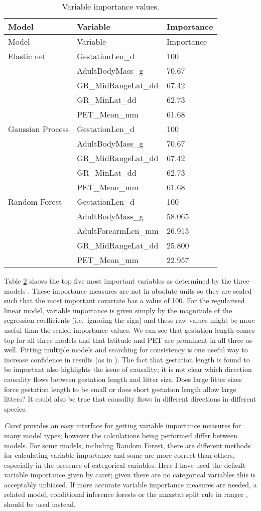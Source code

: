 \documentclass[10pt,]{article}
\begin{document}
\begin{table}[t!]
\begin{longtable}[c]{@{}lll@{}}
\caption{Variable importance values. \label{tbl:varimp}}\tabularnewline
\toprule
Model & Variable & Importance\tabularnewline
\midrule
\endfirsthead
\toprule
Model & Variable & Importance\tabularnewline
\midrule
\endhead
Elastic net & GestationLen\_d & 100\tabularnewline
& AdultBodyMass\_g & 70.67\tabularnewline
& GR\_MidRangeLat\_dd & 67.42\tabularnewline
& GR\_MinLat\_dd & 62.73\tabularnewline
& PET\_Mean\_mm & 61.68\tabularnewline
Gaussian Process & GestationLen\_d & 100\tabularnewline
& AdultBodyMass\_g & 70.67\tabularnewline
& GR\_MidRangeLat\_dd & 67.42\tabularnewline
& GR\_MinLat\_dd & 62.73\tabularnewline
& PET\_Mean\_mm & 61.68\tabularnewline
Random Forest & GestationLen\_d & 100\tabularnewline
& AdultBodyMass\_g & 58.065\tabularnewline
& AdultForearmLen\_mm & 26.915\tabularnewline
& GR\_MidRangeLat\_dd & 25.800\tabularnewline
& PET\_Mean\_mm & 22.957\tabularnewline
\bottomrule
\end{longtable}
\end{table}

Table \ref{tbl:varimp} shows the top five most important variables as determined by the three models \citep{oppel2009alternative}.
These importance measures are not in absolute units so they are scaled such that the most important covariate has a value of 100.
For the regularised linear model, variable importance is given simply by the magnitude of the regression coefficients (i.e.~ignoring the sign) and these raw values might be more useful than the scaled importance values.
We can see that gestation length comes top for all three models and that latitude and PET are prominent in all three as well.
Fitting multiple models and searching for consistency is one useful way to increase confidence in results (as in \citet{appelhans2015evaluating}).
The fact that gestation length is found to be important also highlights the issue of causality; it is not clear which direction causality flows between gestation length and litter size.
Does large litter sizes force gestation length to be small or does short gestation length allow large litters? 
It could also be true that causality flows in different directions in different species.

\emph{Caret} provides an easy interface for getting variable importance measures for many model types; however the calculations being performed differ between models.
For some models, including Random Forest, there are different methods for calculating variable importance \citep{oppel2009alternative, seifert2019surrogate} and some are more correct than others, especially in the presence of categorical variables.
Here I have used the default variable importance given by caret; given there are no categorical variables this is acceptably unbiased.
If more accurate variable importance measures are needed, a related model, conditional inference forests \citep{hothorn2006unbiased} or the maxstat split rule in ranger \citep{wright2017unbiased}, should be used instead.
\end{document}
